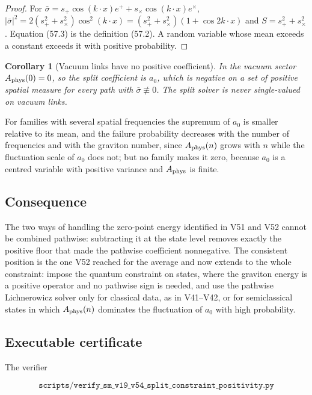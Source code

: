 \documentclass[11pt]{article}
\newtheorem{corollary}[theorem]{Corollary}
\theoremstyle{remark}
\begin{document}
\begin{proof}
For \(\bar\sigma=s_+\cos(k\cdot x)e^++s_\times\cos(k\cdot x)e^\times\),
\(|\bar\sigma|^2=2(s_+^2+s_\times^2)\cos^2(k\cdot x)=(s_+^2+s_\times^2)(1+\cos2k\cdot x)\)
and \(S=s_+^2+s_\times^2\).  Equation (57.3) is the definition (57.2).
A random variable whose mean exceeds a constant exceeds it with positive
probability.
\end{proof}

\begin{corollary}[Vacuum links have no positive coefficient]
\label{cor:v19v54-vacuum}
In the vacuum sector \(A_{\rm phys}(0)=0\), so the split coefficient
is \(a_0\), which is negative on a set of positive spatial measure for
every path with \(\bar\sigma\not\equiv0\).  The split solver is never
single-valued on vacuum links.
\end{corollary}

For families with several spatial frequencies the supremum of
\(a_0\) is smaller relative to its mean, and the failure probability
decreases with the number of frequencies and with the graviton number,
since \(A_{\rm phys}(n)\) grows with \(n\) while the fluctuation scale
of \(a_0\) does not; but no family makes it zero, because \(a_0\) is a
centred variable with positive variance and \(A_{\rm phys}\) is finite.

\subsection{Consequence}

The two ways of handling the zero-point energy identified in V51 and
V52 cannot be combined pathwise: subtracting it at the state level
removes exactly the positive floor that made the pathwise coefficient
nonnegative.  The consistent position is the one V52 reached for the
average and now extends to the whole constraint: impose the quantum
constraint on states, where the graviton energy is a positive operator
and no pathwise sign is needed, and use the pathwise Lichnerowicz
solver only for classical data, as in V41--V42, or for semiclassical
states in which \(A_{\rm phys}(n)\) dominates the fluctuation of
\(a_0\) with high probability.

\subsection{Executable certificate}

The verifier

\[
 \texttt{scripts/verify\_sm\_v19\_v54\_split\_constraint\_positivity.py}
                                                                    \tag{57.4}
\]
\end{document}

